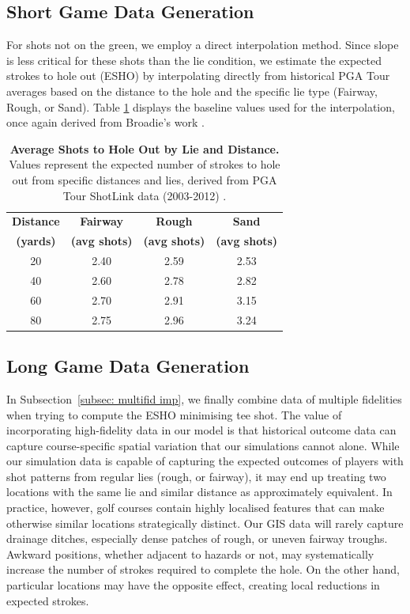 \documentclass[11pt, letterpaper]{article}
\begin{document}
\subsection{Short Game Data Generation}
\label{app: short-game data}

For shots not on the green, we employ a direct interpolation method. Since slope is less critical for these shots than the lie condition, we estimate the expected strokes to hole out (ESHO) by interpolating directly from historical PGA Tour averages based on the distance to the hole and the specific lie type (Fairway, Rough, or Sand). Table \ref{tab:broadie_shortgame} displays the baseline values used for the interpolation, once again derived from Broadie's work \parencite{Broadie_2014a}.

\begin{table}[h!]
    \centering
    \scriptsize
    \caption{\textbf{Average Shots to Hole Out by Lie and Distance.} Values represent the expected number of strokes to hole out from specific distances and lies, derived from PGA Tour ShotLink data (2003-2012) \parencite{Broadie_2014a}.}
    \label{tab:broadie_shortgame}
    \renewcommand{\arraystretch}{1.2}
    \begin{tabular}{cccc}
        \toprule
        \textbf{Distance} & \textbf{Fairway} & \textbf{Rough} & \textbf{Sand} \\
        \textbf{(yards)} & \textbf{(avg shots)} & \textbf{(avg shots)} & \textbf{(avg shots)} \\
        \midrule
        20 & 2.40 & 2.59 & 2.53 \\
        40 & 2.60 & 2.78 & 2.82 \\
        60 & 2.70 & 2.91 & 3.15 \\
        80 & 2.75 & 2.96 & 3.24 \\
        \bottomrule
    \end{tabular}
\end{table}


\subsection{Long Game Data Generation}
\label{app: long-game data}
In Subsection~\ref{subsec: multifid imp}, we finally combine data of multiple fidelities when trying to compute the ESHO minimising tee shot. The value of incorporating high-fidelity data in our model is that historical outcome data can capture course-specific spatial variation that our simulations cannot alone. While our simulation data is capable of capturing the expected outcomes of players with shot patterns from regular lies (rough, or fairway), it may end up treating two locations with the same lie and similar distance as approximately equivalent. In practice, however, golf courses contain highly localised features that can make otherwise similar locations strategically distinct. Our GIS data will rarely capture drainage ditches, especially dense patches of rough, or uneven fairway troughs. Awkward positions, whether adjacent to hazards or not, may systematically increase the number of strokes required to complete the hole. On the other hand, particular locations may have the opposite effect, creating local reductions in expected strokes. 
\end{document}
